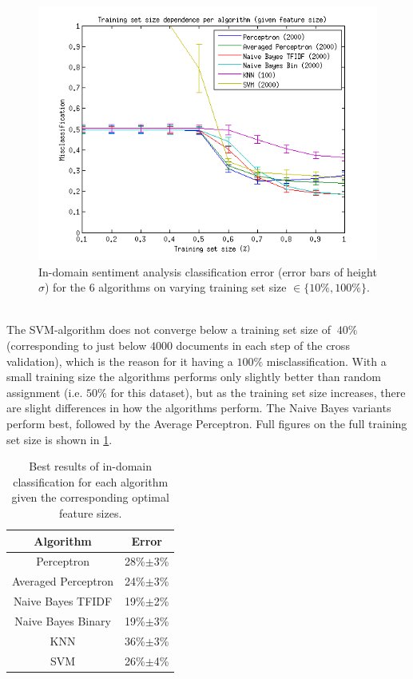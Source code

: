 \begin{figure}[h!]
\centering
\includegraphics[width=1\linewidth]{../Plottar/training_size_k_2000allknn_100.png}
\caption{In-domain sentiment analysis classification error (error bars of height $\sigma$) for the 6 algorithms on varying training set size $\in \{10\%, 100\%\}$.}
\label{fig:trainingsize}
\end{figure}\\
The SVM-algorithm does not converge below a training set size of $~40\%$ (corresponding to just below $4 000$ documents in each step of the cross validation), which is the reason for it having a $100\%$ misclassification. With a small training size the algorithms performs only slightly better than random assignment (i.e. $50\%$ for this dataset), but as the training set size increases, there are slight differences in how the algorithms perform. The Naive Bayes variants perform best, followed by the Average Perceptron. Full figures on the full training set size is shown in \ref{tab:algorithm_best_performance}.

\begin{table}[h!]
	\centering
	\begin{tabular}{ | c | c | } \hline
	\textbf{Algorithm} & \textbf{Error} \\ \hline
	Perceptron & 28\%$\pm$3\% \\ \hline
	Averaged Perceptron & 24\%$\pm$3\% \\ \hline
	Naive Bayes TFIDF & 19\%$\pm$2\% \\ \hline
	Naive Bayes Binary & 19\%$\pm$3\% \\ \hline
	KNN & 36\%$\pm$3\% \\ \hline
	SVM & 26\%$\pm$4\% \\ \hline
	\end{tabular}
	\caption{Best results of in-domain classification for each algorithm given the corresponding optimal feature sizes.}
	\label{tab:algorithm_best_performance}
\end{table}
